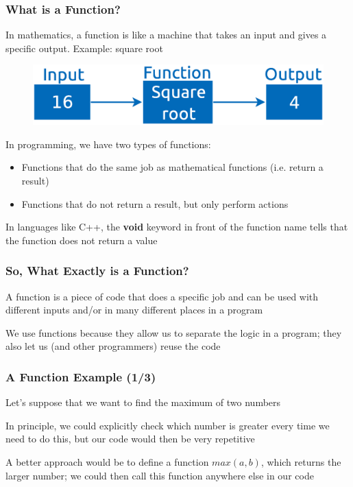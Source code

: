 \documentclass{beamer}
\begin{document}
\begin{frame}
\frametitle{What is a Function?}
    In mathematics, a function is like a machine that takes an input and gives a specific output. Example: square root
    \begin{figure}[H]
        \centering
        \includegraphics[scale=0.3]{figures/square_root_example.eps}
    \end{figure}
    In programming, we have two types of functions:
    \begin{itemize}
        \item Functions that do the same job as mathematical functions (i.e. return a result)
        \item Functions that do not return a result, but only perform actions
    \end{itemize}
    In languages like C++, the \textbf{void} keyword in front of the function name tells that the function does not return a value
\end{frame}

\begin{frame}
\frametitle{So, What Exactly is a Function?}
    A function is a piece of code that does a specific job and can be used with different inputs and/or in many different places in a program
    \newline

    We use functions because they allow us to separate the logic in a program; they also let us (and other programmers) reuse the code
\end{frame}

\begin{frame}
\frametitle{A Function Example (1/3)}
    Let's suppose that we want to find the maximum of two numbers
    \newline

    In principle, we could explicitly check which number is greater every time we need to do this, but our code would then be very repetitive
    \newline

    A better approach would be to define a function $max(a,b)$, which returns the larger number; we could then call this function anywhere else in our code
\end{frame}
\end{document}
